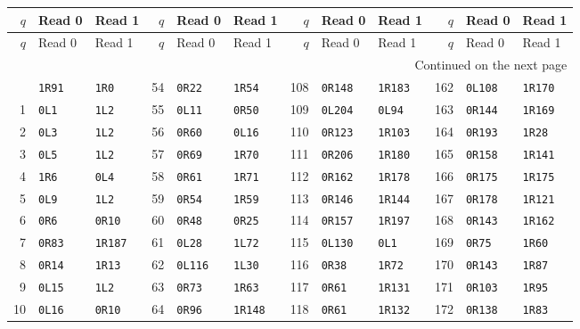 \begingroup\small
\setlength{\tabcolsep}{4pt}
\begin{longtable}{@{}rll@{\qquad}rll@{\qquad}rll@{\qquad}rll@{}}
\toprule
$q$ & Read 0 & Read 1 & $q$ & Read 0 & Read 1 & $q$ & Read 0 & Read 1 & $q$ & Read 0 & Read 1\\
\midrule\endfirsthead
\toprule
$q$ & Read 0 & Read 1 & $q$ & Read 0 & Read 1 & $q$ & Read 0 & Read 1 & $q$ & Read 0 & Read 1\\
\midrule\endhead
\midrule\multicolumn{12}{r}{Continued on the next page}\\\endfoot
\bottomrule\endlastfoot
0 & \texttt{1R91} & \texttt{1R0} & 54 & \texttt{0R22} & \texttt{1R54} & 108 & \texttt{0R148} & \texttt{1R183} & 162 & \texttt{0L108} & \texttt{1R170}\\
1 & \texttt{0L1} & \texttt{1L2} & 55 & \texttt{0L11} & \texttt{0R50} & 109 & \texttt{0L204} & \texttt{0L94} & 163 & \texttt{0R144} & \texttt{1R169}\\
2 & \texttt{0L3} & \texttt{1L2} & 56 & \texttt{0R60} & \texttt{0L16} & 110 & \texttt{0R123} & \texttt{1R103} & 164 & \texttt{0R193} & \texttt{1R28}\\
3 & \texttt{0L5} & \texttt{1L2} & 57 & \texttt{0R69} & \texttt{1R70} & 111 & \texttt{0R206} & \texttt{1R180} & 165 & \texttt{0R158} & \texttt{1R141}\\
4 & \texttt{1R6} & \texttt{0L4} & 58 & \texttt{0R61} & \texttt{1R71} & 112 & \texttt{0R162} & \texttt{1R178} & 166 & \texttt{0R175} & \texttt{1R175}\\
5 & \texttt{0L9} & \texttt{1L2} & 59 & \texttt{0R54} & \texttt{1R59} & 113 & \texttt{0R146} & \texttt{1R144} & 167 & \texttt{0R178} & \texttt{1R121}\\
6 & \texttt{0R6} & \texttt{0R10} & 60 & \texttt{0R48} & \texttt{0R25} & 114 & \texttt{0R157} & \texttt{1R197} & 168 & \texttt{0R143} & \texttt{1R162}\\
7 & \texttt{0R83} & \texttt{1R187} & 61 & \texttt{0L28} & \texttt{1L72} & 115 & \texttt{0L130} & \texttt{0L1} & 169 & \texttt{0R75} & \texttt{1R60}\\
8 & \texttt{0R14} & \texttt{1R13} & 62 & \texttt{0L116} & \texttt{1L30} & 116 & \texttt{0R38} & \texttt{1R72} & 170 & \texttt{0R143} & \texttt{1R87}\\
9 & \texttt{0L15} & \texttt{1L2} & 63 & \texttt{0R73} & \texttt{1R63} & 117 & \texttt{0R61} & \texttt{1R131} & 171 & \texttt{0R103} & \texttt{1R95}\\
10 & \texttt{0L16} & \texttt{0R10} & 64 & \texttt{0R96} & \texttt{1R148} & 118 & \texttt{0R61} & \texttt{1R132} & 172 & \texttt{0R138} & \texttt{1R83}\\

\end{longtable}
